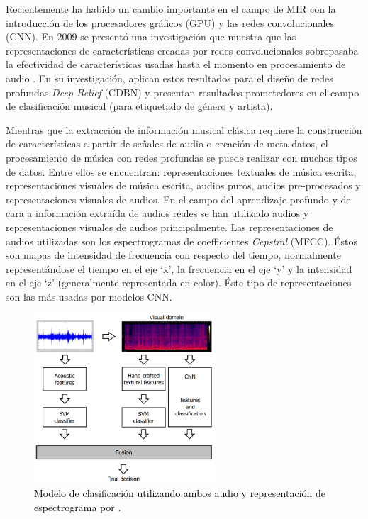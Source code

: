 Recientemente ha habido un cambio importante en el campo de MIR con la introducción de los procesadores gráficos (GPU) y las redes convolucionales (CNN). En 2009 se presentó una investigación que muestra que las representaciones de características creadas por redes convolucionales sobrepasaba la efectividad de características usadas hasta el momento en procesamiento de audio \citep{Lee:2009}. En su investigación, \cite{Lee:2009} aplican estos resultados para el diseño de redes profundas \textit{Deep Belief} (CDBN) y presentan resultados prometedores en el campo de clasificación musical (para etiquetado de género y artista).

Mientras que la extracción de información musical clásica requiere la construcción de características a partir de señales de audio o creación de meta-datos, el procesamiento de música con redes profundas se puede realizar con muchos tipos de datos. Entre ellos se encuentran: representaciones textuales de música escrita, representaciones visuales de música escrita, audios puros, audios pre-procesados y representaciones visuales de audios. En el campo del aprendizaje profundo y de cara a información extraída de audios reales se han utilizado audios y representaciones visuales de audios principalmente. Las representaciones de audios utilizadas son los espectrogramas de coefficientes \textit{Cepstral} (MFCC). Éstos son mapas de intensidad de frecuencia con respecto del tiempo, normalmente representándose el tiempo en el eje `x', la frecuencia en el eje `y' y la intensidad en el eje `z' (generalmente representada en color). Éste tipo de representaciones son las más usadas por modelos CNN. 

\begin{figure}[htb]
  \centering
  \includegraphics[width=0.6\textwidth]{Figures/audio-spectrogram_model_costa2017.png}
  \caption{\textcolor{black}{Modelo de clasificación utilizando ambos audio y representación de espectrograma por \cite{MGCosta:softcomputing:2017}}.}
  \label{Fig:audio-spectrogram_model_costa2017}
\end{figure} 

